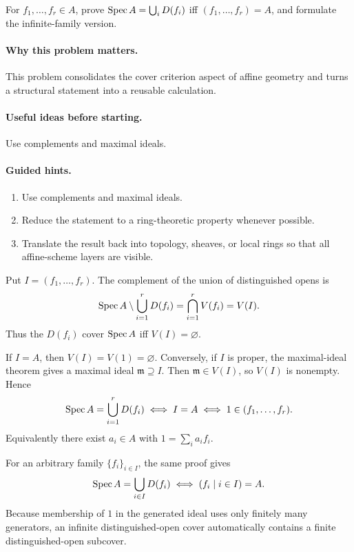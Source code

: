 \begin{problem}\label{prob:vi18-p06}
For $f_1,\dots,f_r\in A$, prove $\operatorname{Spec} A=\bigcup_iD(f_i)$ iff $(f_1,\dots,f_r)=A$, and formulate the infinite-family version.
\end{problem}

\ifdefined\FullProblemDossiers
\paragraph{Why this problem matters.}
This problem consolidates the cover criterion aspect of affine geometry and turns a structural statement into a reusable calculation.

\paragraph{Useful ideas before starting.}
Use complements and maximal ideals.

\paragraph{Guided hints.}
\begin{enumerate}
\item Use complements and maximal ideals.
\item Reduce the statement to a ring-theoretic property whenever possible.
\item Translate the result back into topology, sheaves, or local rings so that all affine-scheme layers are visible.
\end{enumerate}

\begin{solution}
Put $I=(f_1,\dots,f_r)$. The complement of the union of distinguished opens is
\[
\operatorname{Spec} A\setminus\bigcup_{i=1}^rD(f_i)
=\bigcap_{i=1}^rV(f_i)=V(I).
\]
Thus the $D(f_i)$ cover $\operatorname{Spec} A$ iff $V(I)=\varnothing$.

If $I=A$, then $V(I)=V(1)=\varnothing$. Conversely, if $I$ is proper, the maximal-ideal theorem gives a maximal ideal $\mathfrak m\supseteq I$. Then $\mathfrak m\in V(I)$, so $V(I)$ is nonempty. Hence
\[
\operatorname{Spec} A=\bigcup_{i=1}^rD(f_i)
\iff I=A
\iff 1\in(f_1,\dots,f_r).
\]
Equivalently there exist $a_i\in A$ with $1=\sum_i a_if_i$.

For an arbitrary family $\{f_i\}_{i\in I}$, the same proof gives
\[
\operatorname{Spec} A=\bigcup_{i\in I}D(f_i)
\iff (f_i\mid i\in I)=A.
\]
Because membership of $1$ in the generated ideal uses only finitely many generators, an infinite distinguished-open cover automatically contains a finite distinguished-open subcover.
\end{solution}


